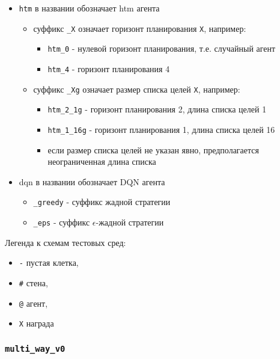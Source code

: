 \documentclass[a4paper]{article}
\begin{document}
\begin{itemize}
    \item \verb|htm| в названии обозначает htm агента
    \begin{itemize}
        \item суффикс \verb|_X| означает горизонт планирования \verb|X|, например:
        \begin{itemize}
            \item \verb|htm_0| - нулевой горизонт планирования, т.е. случайный агент
            \item \verb|htm_4| - горизонт планирования 4
        \end{itemize}
        
        \item суффикс \verb|_Xg| означает размер списка целей \verb|X|, например:
        \begin{itemize}
            \item \verb|htm_2_1g| - горизонт планирования 2, длина списка целей 1
            \item \verb|htm_1_16g| - горизонт планирования 1, длина списка целей 16
            \item если размер списка целей не указан явно, предполагается неограниченная длина списка
        \end{itemize}
    \end{itemize}
    
    \item dqn в названии обозначает DQN агента
    \begin{itemize}
        \item \verb|_greedy| - суффикс жадной стратегии
        \item \verb|_eps| - суффикс $\epsilon$-жадной стратегии
    \end{itemize}
\end{itemize}

Легенда к схемам тестовых сред:

\begin{itemize}
    \item \verb|-| пустая клетка,
    \item \verb|#| стена,
    \item \verb|@| агент,
    \item \verb|X| награда
\end{itemize}

\subsubsection {\texttt{multi\_way\_v0}}
\end{document}
